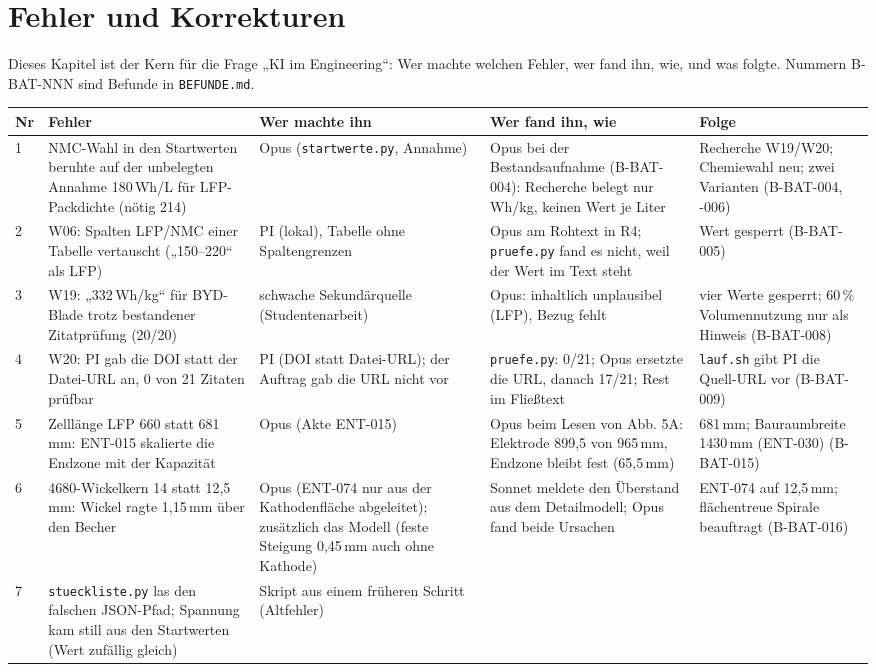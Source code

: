 \documentclass[10pt,a4paper]{article}
\begin{document}
\section{Fehler und Korrekturen}\label{k:fehler}
Dieses Kapitel ist der Kern für die Frage „KI im Engineering“: Wer machte welchen Fehler, wer fand ihn, wie, und was folgte. Nummern B-BAT-NNN sind Befunde in \texttt{BEFUNDE.md}.
\begin{longtable}{@{}p{0.4cm}p{3.6cm}p{2.5cm}p{4.4cm}p{3.0cm}@{}}\toprule
\textbf{Nr} & \textbf{Fehler} & \textbf{Wer machte ihn} & \textbf{Wer fand ihn, wie} & \textbf{Folge}\\\midrule\endhead
1 & NMC-Wahl in den Startwerten beruhte auf der unbelegten Annahme 180\,Wh/L für LFP-Packdichte (nötig 214) & Opus (\texttt{startwerte.py}, Annahme)
 & Opus bei der Bestandsaufnahme (B-BAT-004): Recherche belegt nur Wh/kg, keinen Wert je Liter & Recherche W19/W20; Chemiewahl neu; zwei Varianten (B-BAT-004, -006)\\
2 & W06: Spalten LFP/NMC einer Tabelle vertauscht („150–220“ als LFP) & PI (lokal), Tabelle ohne Spaltengrenzen
 & Opus am Rohtext in R4; \texttt{pruefe.py} fand es nicht, weil der Wert im Text steht & Wert gesperrt (B-BAT-005)\\
3 & W19: „332\,Wh/kg“ für BYD-Blade trotz bestandener Zitatprüfung (20/20) & schwache Sekundärquelle (Studentenarbeit)
 & Opus: inhaltlich unplausibel (LFP), Bezug fehlt & vier Werte gesperrt; 60\,\% Volumennutzung nur als Hinweis (B-BAT-008)\\
4 & W20: PI gab die DOI statt der Datei-URL an, 0 von 21 Zitaten prüfbar & PI (DOI statt Datei-URL); der Auftrag gab die URL nicht vor
 & \texttt{pruefe.py}: 0/21; Opus ersetzte die URL, danach 17/21; Rest im Fließtext & \texttt{lauf.sh} gibt PI die Quell-URL vor (B-BAT-009)\\
5 & Zelllänge LFP 660 statt 681\,mm: ENT-015 skalierte die Endzone mit der Kapazität & Opus (Akte ENT-015)
 & Opus beim Lesen von Abb. 5A: Elektrode 899,5 von 965\,mm, Endzone bleibt fest (65,5\,mm) & 681\,mm; Bauraumbreite 1430\,mm (ENT-030) (B-BAT-015)\\
6 & 4680-Wickelkern 14 statt 12,5\,mm: Wickel ragte 1,15\,mm über den Becher & Opus (ENT-074 nur aus der Kathodenfläche abgeleitet); zusätzlich das Modell (feste Steigung 0,45\,mm auch ohne Kathode)
 & Sonnet meldete den Überstand aus dem Detailmodell; Opus fand beide Ursachen & ENT-074 auf 12,5\,mm; flächentreue Spirale beauftragt (B-BAT-016)\\
7 & \texttt{stueckliste.py} las den falschen JSON-Pfad; Spannung kam still aus den Startwerten (Wert zufällig gleich) & Skript aus einem früheren Schritt (Altfehler)

\end{longtable}
\end{document}

